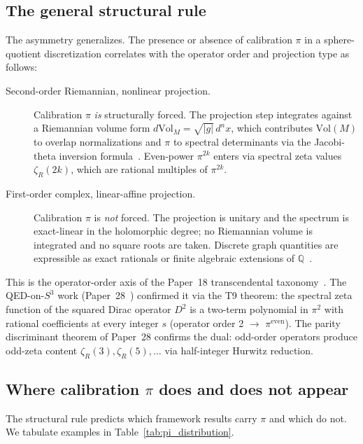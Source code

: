 \documentclass[twocolumn,pra,amsmath,amssymb,superscriptaddress]{revtex4-2}
\begin{document}
\subsection{The general structural rule}

The asymmetry generalizes.  The presence or absence of calibration
$\pi$ in a sphere-quotient discretization correlates with the
operator order and projection type as follows:

\begin{description}
\item[Second-order Riemannian, nonlinear projection.]  Calibration
  $\pi$ \emph{is} structurally forced.  The projection step
  integrates against a Riemannian volume form
  $d\mathrm{Vol}_M = \sqrt{|g|}\, d^n x$, which contributes
  $\mathrm{Vol}(M)$ to overlap normalizations and $\pi$ to spectral
  determinants via the Jacobi-theta inversion formula~\cite{paper28}.
  Even-power $\pi^{2k}$ enters via spectral zeta values
  $\zeta_R(2k)$, which are rational multiples of $\pi^{2k}$.
\item[First-order complex, linear-affine projection.]  Calibration
  $\pi$ is \emph{not} forced.  The projection is unitary and the
  spectrum is exact-linear in the holomorphic degree; no Riemannian
  volume is integrated and no square roots are taken.  Discrete
  graph quantities are expressible as exact rationals or finite
  algebraic extensions of $\mathbb{Q}$~\cite{paper24}.
\end{description}

This is the operator-order axis of the Paper~18 transcendental
taxonomy~\cite{paper18}.  The QED-on-$S^3$ work
(Paper~28~\cite{paper28}) confirmed it via the T9 theorem: the
spectral zeta function of the squared Dirac operator $D^2$ is a
two-term polynomial in $\pi^2$ with rational coefficients at every
integer $s$ (operator order 2 $\to$ $\pi^{\mathrm{even}}$).  The
parity discriminant theorem of Paper~28 confirms the dual: odd-order
operators produce odd-zeta content $\zeta_R(3), \zeta_R(5), \ldots$
via half-integer Hurwitz reduction.

\subsection{Where calibration $\pi$ does and does not appear}

The structural rule predicts which framework results carry $\pi$ and
which do not.  We tabulate examples in
Table~\ref{tab:pi_distribution}.
\end{document}
